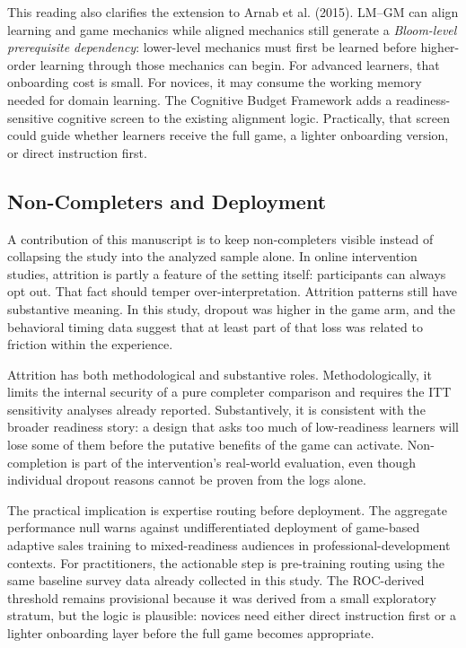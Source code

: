 \documentclass[12pt]{report}
\begin{document}
This reading also clarifies the extension to Arnab et al. (2015). LM--GM can align learning and game mechanics while aligned mechanics still generate a \textit{Bloom-level prerequisite dependency}: lower-level mechanics must first be learned before higher-order learning through those mechanics can begin. For advanced learners, that onboarding cost is small. For novices, it may consume the working memory needed for domain learning. The Cognitive Budget Framework adds a readiness-sensitive cognitive screen to the existing alignment logic. Practically, that screen could guide whether learners receive the full game, a lighter onboarding version, or direct instruction first.

\subsection{Non-Completers and Deployment}
A contribution of this manuscript is to keep non-completers visible instead of collapsing the study into the analyzed sample alone. In online intervention studies, attrition is partly a feature of the setting itself: participants can always opt out. That fact should temper over-interpretation. Attrition patterns still have substantive meaning. In this study, dropout was higher in the game arm, and the behavioral timing data suggest that at least part of that loss was related to friction within the experience.

Attrition has both methodological and substantive roles. Methodologically, it limits the internal security of a pure completer comparison and requires the ITT sensitivity analyses already reported. Substantively, it is consistent with the broader readiness story: a design that asks too much of low-readiness learners will lose some of them before the putative benefits of the game can activate. Non-completion is part of the intervention's real-world evaluation, even though individual dropout reasons cannot be proven from the logs alone.

The practical implication is expertise routing before deployment. The aggregate performance null warns against undifferentiated deployment of game-based adaptive sales training to mixed-readiness audiences in professional-development contexts. For practitioners, the actionable step is pre-training routing using the same baseline survey data already collected in this study. The ROC-derived threshold remains provisional because it was derived from a small exploratory stratum, but the logic is plausible: novices need either direct instruction first or a lighter onboarding layer before the full game becomes appropriate.
\end{document}
